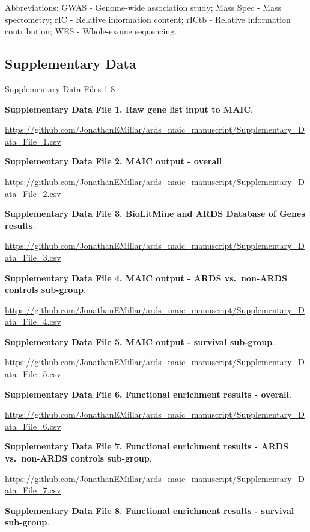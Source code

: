 \documentclass[
  11,
  a4paper,
]{article}
\begin{document}
\begin{scriptsize}
Abbreviations: GWAS - Genome-wide association study; Mass Spec - Mass spectometry; rIC - Relative information content; rICtb - Relative information contribution; WES - Whole-exome sequencing.
\end{scriptsize}

\newpage

\hypertarget{supplementary-data}{%
\subsection{Supplementary Data}\label{supplementary-data}}

Supplementary Data Files 1-8

\newpage

\textbf{Supplementary Data File 1. Raw gene list input to MAIC}.

\url{https://github.com/JonathanEMillar/ards_maic_manuscript/Supplementary_Data_File_1.csv}

\textbf{Supplementary Data File 2. MAIC output - overall}.

\url{https://github.com/JonathanEMillar/ards_maic_manuscript/Supplementary_Data_File_2.csv}

\textbf{Supplementary Data File 3. BioLitMine and ARDS Database of Genes
results}.

\url{https://github.com/JonathanEMillar/ards_maic_manuscript/Supplementary_Data_File_3.csv}

\textbf{Supplementary Data File 4. MAIC output - ARDS vs.~non-ARDS
controls sub-group}.

\url{https://github.com/JonathanEMillar/ards_maic_manuscript/Supplementary_Data_File_4.csv}

\textbf{Supplementary Data File 5. MAIC output - survival sub-group}.

\url{https://github.com/JonathanEMillar/ards_maic_manuscript/Supplementary_Data_File_5.csv}

\textbf{Supplementary Data File 6. Functional enrichment results -
overall}.

\url{https://github.com/JonathanEMillar/ards_maic_manuscript/Supplementary_Data_File_6.csv}

\textbf{Supplementary Data File 7. Functional enrichment results - ARDS
vs.~non-ARDS controls sub-group}.

\url{https://github.com/JonathanEMillar/ards_maic_manuscript/Supplementary_Data_File_7.csv}

\textbf{Supplementary Data File 8. Functional enrichment results -
survival sub-group}.
\end{document}
